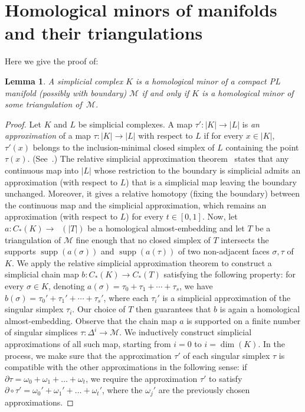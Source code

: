 \documentclass[11pt]{article}
\newcommand{\M}{\mathcal{M}}
\DeclareMathOperator{\supp}{supp}
\DeclareMathOperator{\Csing}{C_*^{sing}}
\newtheorem{replemma}{Lemma}
\begin{document}
\section{Homological minors of manifolds and their triangulations}\label{app:simpapp}
%
Here we give the proof of:
%
\setcounter{replemma}{7}
\begin{replemma}
    A simplicial complex $K$ is a homological minor of a compact PL manifold (possibly with boundary) $\M$ if and only if $K$ is a homological minor of some triangulation of~$\M$.
\end{replemma}
\begin{proof}
  Let $K$ and $L$ be simplicial complexes. A map $\tau':|K|\to |L|$ is \emph{an approximation} of a map $\tau:|K|\to |L|$ with respect to $L$ if for every $x\in |K|$, $\tau'(x)$ belongs to the inclusion-minimal closed simplex of $L$ containing the point $\tau(x)$. (See~\cite{zeeman1964relative}.) The relative simplicial approximation theorem~\cite{zeeman1964relative} states that any continuous map into $|L|$ whose restriction to the boundary is simplicial admits an approximation (with respect to $L$) that is a simplicial map leaving the boundary unchanged. Moreover, it gives a relative homotopy (fixing the boundary) between the continuous map and the simplicial approximation, which remains an approximation (with respect to $L$) for every $t\in[0,1]$.
%
\medskip
%
Now, let $a:C_*(K)\to\Csing(|T|)$ be a homological almost-embedding and let $T$ be a triangulation of $\M$ fine enough that no closed simplex of $T$ intersects the supports $\supp(a(\sigma))$ and $\supp(a(\tau))$ of two non-adjacent faces $\sigma,\tau$ of $K$. We apply the relative simplicial approximation theorem to construct a simplicial chain map $b \colon C_*(K)\longrightarrow C_*(T)$ satisfying the following property: for every $\sigma\in K$, denoting $a(\sigma)=\tau_0+\tau_1+\cdots+\tau_s$, we have $b(\sigma)=\tau_0'+\tau_1'+\cdots+\tau_s'$, where each $\tau_i'$ is a simplicial approximation of the singular simplex $\tau_i$. Our choice of $T$ then guarantees that $b$ is again a homological almost-embedding.
%
\medskip
%
Observe that the chain map $a$ is supported on a finite number of singular simplices $\tau:\Delta^i\to \M$. We inductively construct simplicial approximations of all such map, starting from $i=0$ to $i=\dim(K)$. In the process, we make sure that the approximation $\tau'$ of each singular simplex $\tau$ is compatible with the other approximations in the following sense: if $\partial \tau=\omega_0+\omega_1+\ldots+\omega_t$, we require the approximation $\tau'$ to satisfy $\partial\circ \tau'= \omega_0'+\omega_1'+\ldots+\omega_t'$, where the $\omega_j'$ are the previously chosen approximations.

\end{proof}
\end{document}
